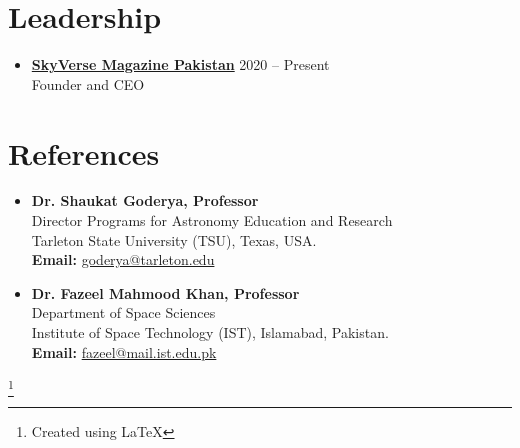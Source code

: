 \documentclass{article}
\newcommand\blfootnote[1]{%
  \begingroup
  \renewcommand\thefootnote{}\footnote{#1}%
  \addtocounter{footnote}{-1}%
  \endgroup
}
\begin{document}
\section*{Leadership}
\vspace{-\baselineskip}
\noindent\makebox[\linewidth]{\rule{\textwidth}{0.4pt}}
\begin{itemize}
    \item \textbf{\href{https://skyversemagazine.org/team-member/}{SkyVerse Magazine Pakistan}} \hfill 2020 -- Present \\
    Founder and CEO
\end{itemize}

\section*{References}
\vspace{-\baselineskip}
\noindent\makebox[\linewidth]{\rule{\textwidth}{0.4pt}}
\begin{itemize}
    \item \textbf{Dr. Shaukat Goderya, Professor} \\
    Director Programs for Astronomy Education and Research \\ Tarleton State University (TSU), Texas, USA. \\
    \textbf{Email:} \href{mailto:goderya@tarleton.edu}{goderya@tarleton.edu}
    \item \textbf{Dr. Fazeel Mahmood Khan,  Professor}  \\
    Department of Space Sciences \\
    Institute of Space Technology (IST), Islamabad, Pakistan. \\
    \textbf{Email:} \href{mailto:fazeel@mail.ist.edu.pk}{fazeel@mail.ist.edu.pk}
\end{itemize}

\blfootnote{Created using \LaTeX}
\end{document}
